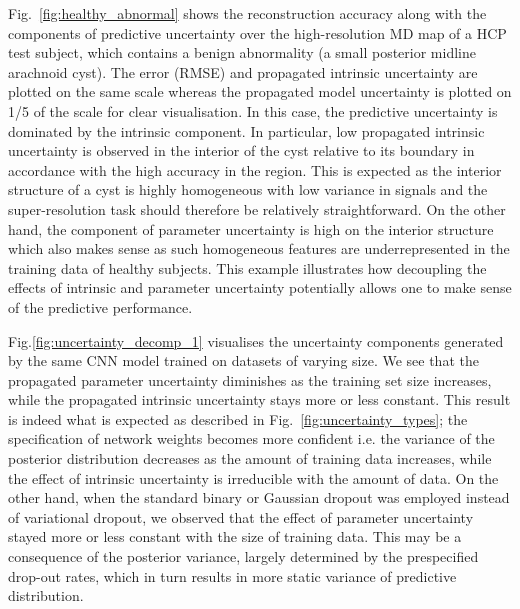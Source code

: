 Fig.~\ref{fig:healthy_abnormal} shows the reconstruction accuracy along with the components of predictive uncertainty over the high-resolution MD map of a HCP test subject, which contains a benign abnormality (a small posterior midline arachnoid cyst). The error (RMSE) and propagated intrinsic uncertainty are plotted on the same scale whereas the propagated model uncertainty is plotted on 1/5 of the scale for clear visualisation. In this case, the predictive uncertainty is dominated by the intrinsic component. In particular, low propagated intrinsic uncertainty is observed in the interior of the cyst relative to its boundary in accordance with the high accuracy in the region. This is expected as the interior structure of a cyst is highly homogeneous with low variance in signals and the super-resolution task should therefore be relatively straightforward. On the other hand, the component of parameter uncertainty is high on the interior structure which also makes sense as such homogeneous features are underrepresented in the  training data of healthy subjects. This example illustrates how decoupling the effects of intrinsic and parameter uncertainty potentially allows one to make sense of the predictive performance. 

Fig.\ref{fig:uncertainty_decomp_1} visualises the uncertainty components generated by the same CNN model trained on datasets of varying size. We see that the propagated parameter uncertainty diminishes as the training set size increases, while the propagated intrinsic uncertainty stays more or less constant. This result is indeed what is expected as described in Fig.~\ref{fig:uncertainty_types}; the specification of network weights becomes more confident i.e. the variance of the posterior distribution decreases as the amount of training data increases, while the effect of intrinsic uncertainty is irreducible with the amount of data.  On the other hand, when the standard binary or Gaussian dropout was employed instead of variational dropout, we observed that the effect of parameter uncertainty stayed more or less constant with the size of training data. This may be a consequence of the posterior variance, largely determined by the prespecified drop-out rates, which in turn results in more static variance of predictive distribution. 


